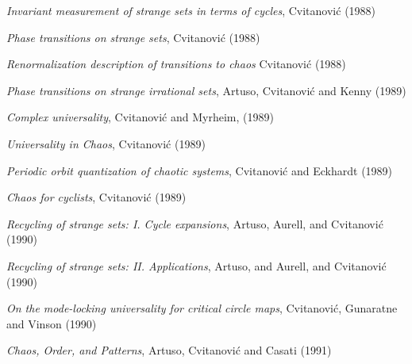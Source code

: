 {\em Invariant measurement of strange sets in terms of cycles},
{Cvitanovi{\'c}}
{(1988)}

{\em Phase transitions on strange sets},
{Cvitanovi{\'c}}
{(1988)}

{\em Renormalization description of transitions to chaos}
{Cvitanovi{\'c}}
{(1988)}

{\em Phase transitions on strange irrational sets},
{Artuso,  Cvitanovi{\'c} and Kenny}
{(1989)}

{\em Complex universality},
{Cvitanovi{\'c} and Myrheim},
{(1989)}

{\em {Universality in Chaos}},
{Cvitanovi{\'c}}
{(1989)}

{\em Periodic orbit quantization of chaotic systems},
{Cvitanovi{\'c} and Eckhardt}
{(1989)}

{\em Chaos for cyclists},
{Cvitanovi{\'c}}
{(1989)}

{\em Recycling of strange sets: {I. Cycle} expansions},
{Artuso, Aurell, and Cvitanovi{\'c}}
{(1990)}

{\em Recycling of strange sets: {II. Applications}},
{Artuso, and Aurell, and Cvitanovi{\'c}}
{(1990)}

{\em On the mode-locking universality for critical circle maps},
{Cvitanovi{\'c}, Gunaratne and Vinson}
{(1990)}

{\em {Chaos, Order, and Patterns}},
{Artuso, Cvitanovi{\'c} and Casati}
{(1991)}

